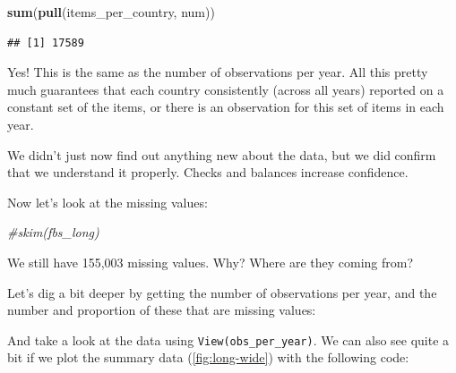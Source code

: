 \documentclass[]{book}
\makeatletter
\newenvironment{Shaded}{\begin{snugshade}}{\end{snugshade}}
\newcommand{\CommentTok}[1]{\textcolor[rgb]{0.56,0.35,0.01}{\textit{#1}}}
\newcommand{\DataTypeTok}[1]{\textcolor[rgb]{0.13,0.29,0.53}{#1}}
\newcommand{\KeywordTok}[1]{\textcolor[rgb]{0.13,0.29,0.53}{\textbf{#1}}}
\newcommand{\NormalTok}[1]{#1}
\newcommand{\OperatorTok}[1]{\textcolor[rgb]{0.81,0.36,0.00}{\textbf{#1}}}
\newcommand{\StringTok}[1]{\textcolor[rgb]{0.31,0.60,0.02}{#1}}
\newenvironment{kframe}{%
\medskip{}
\setlength{\fboxsep}{.8em}
 \def\at@end@of@kframe{}%
 \ifinner\ifhmode%
  \def\at@end@of@kframe{\end{minipage}}%
  \begin{minipage}{\columnwidth}%
 \fi\fi%
 \def\FrameCommand##1{\hskip\@totalleftmargin \hskip-\fboxsep
 \colorbox{shadecolor}{##1}\hskip-\fboxsep
     \hskip-\linewidth \hskip-\@totalleftmargin \hskip\columnwidth}%
 \MakeFramed {\advance\hsize-\width
   \@totalleftmargin\z@ \linewidth\hsize
   \@setminipage}}%
 {\par\unskip\endMakeFramed%
 \at@end@of@kframe}
\newenvironment{rmdblock}[1]
  {
  \begin{itemize}
  \renewcommand{\labelitemi}{
    \raisebox{-.7\height}[0pt][0pt]{
      {\setkeys{Gin}{width=3em,keepaspectratio}\texttt{[image: images/\#1]}}
    }
  }
  \setlength{\fboxsep}{1em}
  \begin{kframe}
  \item
  }
  {
  \end{kframe}
  \end{itemize}
  }
\newenvironment{safety}
  {\begin{rmdblock}{safety}}
  {\end{rmdblock}}
\makeatother
\begin{document}
\begin{Shaded}
\begin{Highlighting}[]
\KeywordTok{sum}\NormalTok{(}\KeywordTok{pull}\NormalTok{(items_per_country, num))}
\end{Highlighting}
\end{Shaded}

\begin{verbatim}
## [1] 17589
\end{verbatim}

Yes! This is the same as the number of observations per year. All this pretty much guarantees that each country consistently (across all years) reported on a constant set of the items, or there is an observation for this set of items in each year.

\begin{safety}
We didn't just now find out anything new about the data, but we did
confirm that we understand it properly. Checks and balances increase
confidence.
\end{safety}

Now let's look at the missing values:

\begin{Shaded}
\begin{Highlighting}[]
\CommentTok{#skim(fbs_long)}
\end{Highlighting}
\end{Shaded}

We still have 155,003 missing values. Why? Where are they coming from?

Let's dig a bit deeper by getting the number of observations per year, and the number and proportion of these that are missing values:

\begin{Shaded}
\end{Shaded}

And take a look at the data using \texttt{View(obs\_per\_year)}. We can also see quite a bit if we plot the summary data (\ref{fig:long-wide}) with the following code:
\end{document}
